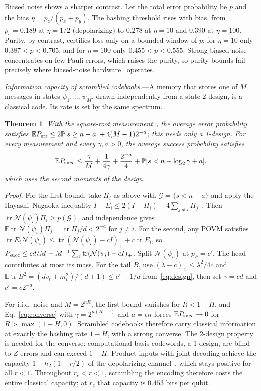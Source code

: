 \documentclass[aps,prl,reprint,superscriptaddress,amsmath,amssymb]{revtex4-2}
\newtheorem{theorem}{Theorem}
\newcommand{\E}{\mathbb E}
\newcommand{\N}{\mathcal N}
\newcommand{\tr}{\operatorname{tr}}
\newcommand{\prob}{\mathbb P}
\begin{document}
Biased noise shows a sharper contrast. Let the total error probability be $p$
and the bias $\eta=p_z/(p_x+p_y)$. The hashing threshold rises with bias, from
$p_c=0.189$ at $\eta=1/2$ (depolarizing) to $0.278$ at $\eta=10$ and $0.390$ at
$\eta=100$. Purity, by contrast, certifies loss only on a bounded window of
$p$: for $\eta=10$ only $0.387<p<0.705$, and for $\eta=100$ only
$0.455<p<0.555$. Strong biased noise concentrates on few Pauli errors, which
raises the purity, so purity bounds fail precisely where biased-noise
hardware~\cite{Puri} operates.

\emph{Information capacity of scrambled codebooks.}---A memory that stores one
of $M$ messages in states $\psi_1,\ldots,\psi_M$, drawn independently from a
state 2-design, is a classical code. Its rate is set by the same spectrum.

\begin{theorem}
With the square-root measurement~\cite{HayashiNagaoka}, the average error
probability satisfies
$\E P_{\rm err}\le2\prob[s\ge n-a]+4(M-1)2^{-a}$; this needs only a 1-design.
For every measurement and every $\gamma,a>0$, the average success probability
satisfies
\begin{equation}
\E P_{\rm succ}\le\frac\gamma M+\frac1{4\gamma}+\frac{2^{-a}}4
+\prob[s<n-\log_2\gamma+a],
\label{eq:converse}
\end{equation}
which uses the second moments of the design.
\end{theorem}

\begin{proof}
For the first bound, take $\Pi_i$ as above with $\mathcal G=\{s<n-a\}$ and
apply the Hayashi--Nagaoka inequality
$I-E_i\le2(I-\Pi_i)+4\sum_{j\ne i}\Pi_j$~\cite{HayashiNagaoka}. Then
$\tr\N(\psi_i)\Pi_i\ge p(\mathcal G)$, and independence gives
$\E\tr\N(\psi_i)\Pi_j=\tr\Pi_j/d<2^{-a}$ for $j\ne i$. For the second, any POVM
satisfies $\tr E_i\N(\psi_i)\le\tr(\N(\psi_i)-cI)_++c\tr E_i$, so
$P_{\rm succ}\le cd/M+M^{-1}\sum_i\tr(\N(\psi_i)-cI)_+$. Split $\N(\psi_i)$ at
$p_P=c'$. The head contributes at most its mass. For the tail $B$, use
$(\lambda-c)_+\le\lambda^2/4c$ and
$\E\tr B^2=(dv_t+m_t^2)/(d+1)\le c'+1/d$ from~\eqref{eq:design}, then set
$\gamma=cd$ and $c'=c2^{-a}$.
\end{proof}

For i.i.d. noise and $M=2^{nR}$, the first bound vanishes for $R<1-H$, and
Eq.~\eqref{eq:converse} with $\gamma=2^{n(R-\epsilon)}$ and $a=\epsilon n$
forces $\E P_{\rm succ}\to0$ for $R>\max(1-H,0)$. Scrambled codebooks therefore
carry classical information at exactly the hashing rate $1-H$, with a strong
converse. The 2-design property is needed for the converse: computational-basis
codewords, a 1-design, are blind to $Z$ errors and can exceed $1-H$. Product
inputs with joint decoding achieve the capacity $1-h_2(1-r/2)$ of the
depolarizing channel~\cite{King}, which stays positive for all $r<1$. Throughout
$r_c<r<1$, scrambling the encoding therefore costs the entire classical
capacity; at $r_c$ that capacity is $0.453$ bits per qubit.
\end{document}
